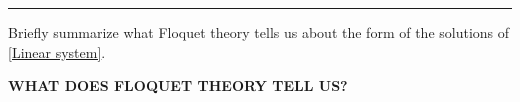 \documentclass[12pt]{article}
\newcommand{\jump}{\vspace{5mm}}
\begin{document}
\begin{enumerate}[]
        \jump
        \hrule
        
        \jump
        Briefly summarize what Floquet theory tells us about the form of the solutions of \ref{Linear system}.

        \begin{solution}
        
            \textbf{WHAT DOES FLOQUET THEORY TELL US?}
        \end{solution}
        
\end{enumerate}
\end{document}
